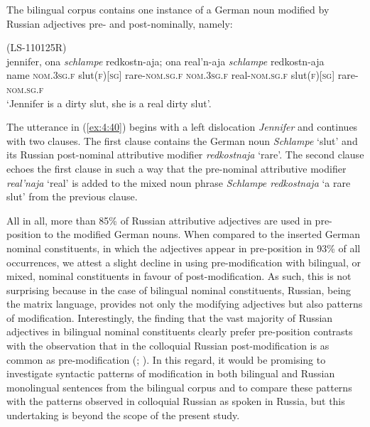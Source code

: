 The bilingual corpus contains one instance of a German noun modified by Russian adjectives pre- and post-nominally, namely:

\ea
\label{ex:4:40}
(LS-110125R)\\
\gll jennifer, ona \textit{schlampe}  redkostn-aja; ona real'n-aja \textit{schlampe}  redkostn-aja\\
	name \textsc{nom.3sg.f} slut(\textsc{f})[\textsc{sg}] rare-\textsc{nom.sg.f} \textsc{nom.3sg.f} real-\textsc{nom.sg.f} slut(\textsc{f})[\textsc{sg}] rare-\textsc{nom.sg.f}\\
\glt `Jennifer is a dirty slut, she is a real dirty slut'.
\z

\noindent The utterance in (\ref{ex:4:40}) begins with a left dislocation \textit{Jennifer} and continues with two clauses. The first clause contains the German noun \textit{Schlampe} `slut' and its Russian post-nominal attributive modifier \textit{redkostnaja} `rare'. The second clause echoes the first clause in such a way that the pre-nominal attributive modifier \textit{real'naja} ‘real’ is added to the mixed noun phrase \textit{Schlampe redkostnaja} `a rare slut' from the previous clause.

All in all, more than 85\% of Russian attributive adjectives are used in pre-position to the modified German nouns. When compared to the inserted German nominal constituents, in which the adjectives appear in pre-position in 93\% of all occurrences, we attest a slight decline in using pre-modification with bilingual, or mixed, nominal constituents in favour of post-modification. As such, this is not surprising because in the case of bilingual nominal constituents, Russian, being the matrix language, provides not only the modifying adjectives but also patterns of modification. Interestingly, the finding that the vast majority of Russian adjectives in bilingual nominal constituents clearly prefer pre-position contrasts with the observation that in the colloquial Russian post-modification is as common as pre-modification (\citealt[207]{lapteva}; \citealt[148--149]{zemskaja}). In this regard, it would be promising to investigate syntactic patterns of modification in both bilingual and Russian monolingual sentences from the bilingual corpus and to compare these patterns with the patterns observed in colloquial Russian as spoken in Russia, but this undertaking is beyond the scope of the present study.

